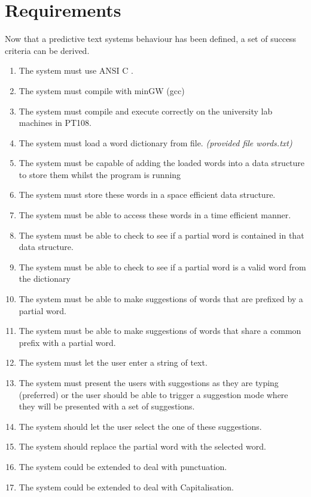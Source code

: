 \documentclass[10pt]{article} %
\begin{document}
	\section{Requirements}
		Now that a predictive text systems behaviour has been defined, a set of success criteria can be derived.
		\begin{enumerate}
			\item The system must use ANSI C .
			\item The system must compile with minGW (gcc)
			\item The system must compile and execute correctly on the university lab machines in PT108.
			\item The system must load a word dictionary from file. \textit{(provided file words.txt)}
			
			\item The system must be capable of adding the loaded words into a data structure to store them whilst the program is running
			\item The system must store these words in a space efficient data structure.
			\item The system must be able to access these words in a time efficient manner.
			
			\item The system must be able to check to see if a partial word is contained in that data structure.
			\item The system must be able to check to see if a partial word is a valid word from the dictionary
			\item The system must be able to make suggestions of words that are prefixed by a partial word.
			\item The system must be able to make suggestions of words that share a common prefix with a partial word.
			
			\item The system must let the user enter a string of text.
			\item The system must present the users with suggestions as they are typing (preferred) or the user should be able to trigger a suggestion mode where they will be presented with a set of suggestions.
			\item The system should let the user select the one of these suggestions.
			\item The system should replace the partial word with the selected word.
			
			\item The system could be extended to deal with punctuation.
			\item The system could be extended to deal with Capitalisation.
			
		\end{enumerate}
\end{document}
